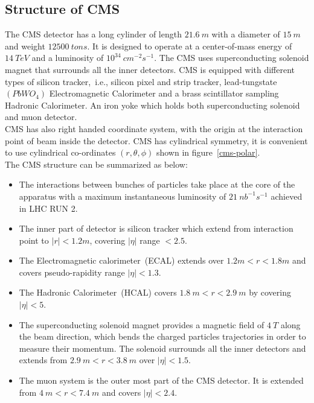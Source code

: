 \subsection{Structure of CMS}
The CMS detector has a long cylinder of length $21.6~m$ with a diameter of $15~m$ and weight $12500~tons$. It is designed to operate at a center-of-mass energy of $14~TeV$ and a luminosity of $10^{34}~cm^{-2}s^{-1}$. The CMS uses superconducting solenoid magnet that surrounds all the inner detectors. CMS is equipped with different types of silicon tracker,~i.e., silicon pixel and strip tracker, lead-tungstate~$(PbWO_4)$ Electromagnetic Calorimeter and a brass scintillator sampling Hadronic Calorimeter. An iron yoke which holds both superconducting solenoid and muon detector.\\ 
CMS has also right handed coordinate system, with the origin at the interaction point of beam inside the detector. CMS has cylindrical symmetry, it is convenient to use cylindrical co-ordinates $(r,\theta,\phi)$ shown in figure~\ref{cms-polar}.\\
The CMS structure can be summarized as below:
\begin{itemize}
\item The interactions between bunches of particles take place at the core of the apparatus with a maximum instantaneous luminosity of $21~nb^{-1}s^{-1}$ achieved in LHC RUN 2.
\item The inner part of detector is silicon tracker which extend from interaction point to $|r|<1.2m$, covering $|\eta|$ range $<2.5$.
\item The Electromagnetic calorimeter~(ECAL) extends over $1.2m < r < 1.8m$ and covers pseudo-rapidity range $|\eta|<1.3$.
\item The Hadronic Calorimeter~(HCAL) covers $1.8~m < r <2.9~m$ by covering $|\eta|<5$.
\item The superconducting solenoid magnet provides a magnetic field of $4~T$ along the beam direction, which bends the charged particles trajectories in order to measure their momentum. The solenoid surrounds all the inner detectors and extends from $2.9~m < r < 3.8~m$ over $|\eta|<1.5$. 
\item The muon system is the outer most part of the CMS detector. It is extended from $4~m < r < 7.4~m$ and covers $|\eta|<2.4$.
\end{itemize}
